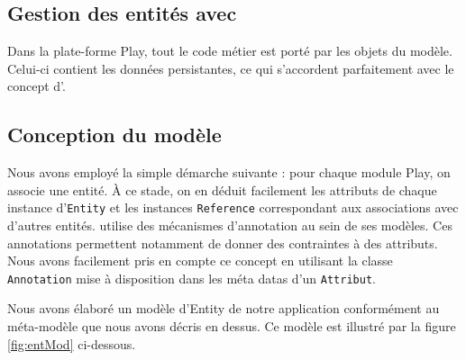 \subsection{Gestion des entités avec \kwplay{}}

Dans la plate-forme Play, tout le code métier est porté par les objets du modèle. Celui-ci contient les données persistantes, ce qui s'accordent parfaitement avec le concept d'\kwentity.  
         

\subsection{Conception du modèle}
Nous avons employé la simple démarche suivante : pour chaque module Play, on associe une entité. À ce stade, on en déduit facilement les attributs de chaque instance d'\verb+Entity+ et les instances \verb+Reference+ correspondant aux associations avec d'autres entités. \kwplay{} utilise des mécanismes d'annotation au sein de ses modèles. Ces annotations permettent notamment de donner des contraintes à des attributs. Nous avons facilement pris en compte ce concept en utilisant la classe \verb+Annotation+ mise à disposition dans les méta datas d'un \verb+Attribut+.

Nous avons élaboré un modèle d'Entity de notre application conformément au méta-modèle que nous avons décris en dessus. Ce modèle est illustré par la figure \ref{fig:entMod} ci-dessous.

